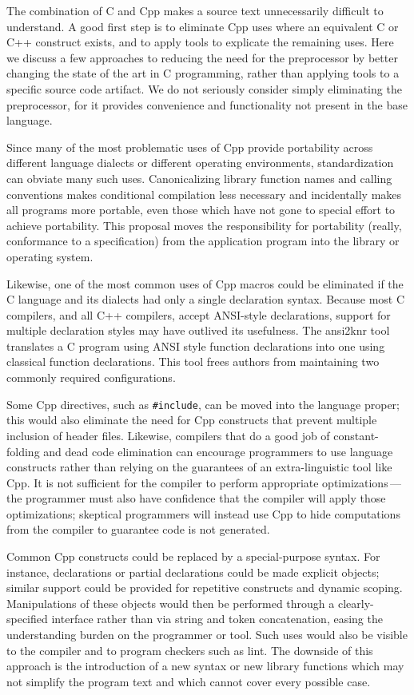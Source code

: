 \documentclass[10pt]{article}
\begin{document}
The combination of C and Cpp makes a source text unnecessarily difficult
to understand.  A good first step is to eliminate Cpp uses where an
equivalent C or C++ construct exists, and to apply tools to explicate
the remaining uses.  Here we discuss a few approaches to reducing the
need for the preprocessor by better changing the state of the art in C
programming, rather than applying tools to a specific source code
artifact.  We do not seriously consider simply eliminating the
preprocessor, for it provides convenience and functionality not present
in the base language.

Since many of the most problematic uses of Cpp provide portability across
different language dialects or different operating environments,
standardization can obviate many such uses.  Canonicalizing library
function names and calling conventions makes conditional compilation less
necessary and incidentally makes all programs more portable, even those
which have not gone to special effort to achieve portability.  This
proposal moves the responsibility for portability (really, conformance to a
specification) from the application program into the library or operating
system.  

Likewise, one of the most common uses of Cpp macros could be eliminated if
the C language and its dialects had only a single declaration syntax.
Because most C compilers, and all C++ compilers, accept ANSI-style
declarations, support for multiple declaration styles may have outlived its
usefulness.  The ansi2knr tool~\cite{Deutsch90} translates a C program
using ANSI style function declarations into one using classical function
declarations.  This tool frees authors from maintaining two commonly
required configurations.

Some Cpp directives, such as {\tt \#include}, can be moved into the
language proper; this would also eliminate the need for Cpp constructs
that prevent multiple inclusion of header files.  Likewise, compilers
that do a good job of constant-folding and dead code elimination can
encourage programmers to use language constructs rather than relying on
the guarantees of an extra-linguistic tool like Cpp.  It is not
sufficient for the compiler to perform appropriate
optimizations\,---\,the programmer must also have confidence that the
compiler will apply those optimizations; skeptical programmers will
instead use Cpp to hide computations from the compiler to 
guarantee code is not generated.

Common Cpp constructs could be replaced by a special-purpose syntax.  For
instance, declarations or partial declarations could be made explicit
objects; similar support could be provided for repetitive constructs and
dynamic scoping.  Manipulations of these objects would then be performed
through a clearly-specified interface rather than via string and token
concatenation, easing the understanding burden on the programmer or tool.
Such uses would also be visible to the compiler and to program checkers
such as lint.  The downside of this approach is the introduction of a new
syntax or new library functions which may not simplify the program text and
which cannot cover every possible case.
\end{document}

